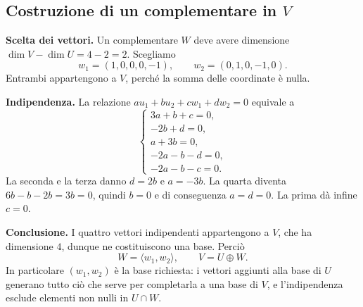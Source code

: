 \subsection{Costruzione di un complementare in \texorpdfstring{$V$}{V}}
\begin{svolgimento}
\textbf{Scelta dei vettori.} Un complementare $W$ deve avere dimensione $\dim V-\dim U=4-2=2$. Scegliamo
\[
  w_1=(1,0,0,0,-1),\qquad w_2=(0,1,0,-1,0).
\]
Entrambi appartengono a $V$, perché la somma delle coordinate è nulla.

\textbf{Indipendenza.} La relazione $au_1+bu_2+cw_1+dw_2=0$ equivale a
\[
  \begin{cases}
    3a+b+c=0,\\
    -2b+d=0,\\
    a+3b=0,\\
    -2a-b-d=0,\\
    -2a-b-c=0.
  \end{cases}
\]
La seconda e la terza danno $d=2b$ e $a=-3b$. La quarta diventa $6b-b-2b=3b=0$, quindi $b=0$ e di conseguenza $a=d=0$. La prima dà infine $c=0$.

\textbf{Conclusione.} I quattro vettori indipendenti appartengono a $V$, che ha dimensione $4$, dunque ne costituiscono una base. Perciò
\[
  W=\langle w_1,w_2\rangle,\qquad V=U\oplus W.
\]
In particolare $(w_1,w_2)$ è la base richiesta: i vettori aggiunti alla base di $U$ generano tutto ciò che serve per completarla a una base di $V$, e l'indipendenza esclude elementi non nulli in $U\cap W$.
\end{svolgimento}

